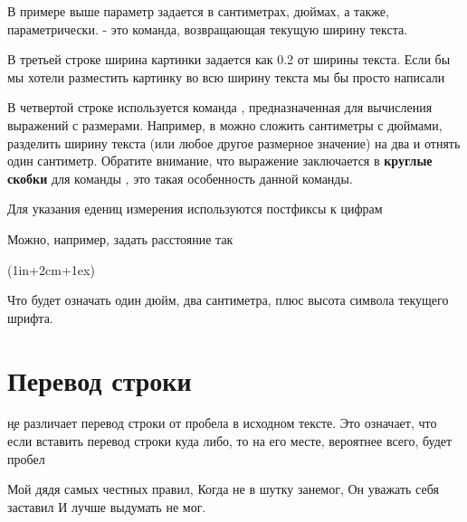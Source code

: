 {{{{В примере выше параметр  задается в сантиметрах, дюймах, а
также, параметрически.  - это команда, возвращающая текущую
ширину текста.

В третьей строке ширина картинки задается как 0.2 от ширины текста. Если бы мы
хотели разместить картинку во всю ширину текста мы бы просто
написали 

В четвертой строке используется команда , предназначенная для
вычисления выражений с размерами. Например, в  можно сложить
сантиметры с дюймами, разделить ширину текста (или любое другое размерное
значение) на два и отнять один сантиметр. Обратите внимание, что выражение
заключается в {\bf круглые скобки} для команды , это такая
особенность данной команды.

Для указания едениц измерения используются постфиксы к цифрам


Можно, например, задать расстояние так

\startTEX
\dimexpr(1in+2cm+1ex)
\stopTEX

Что будет означать один дюйм, два сантиметра, плюс высота символа 
текущего шрифта.

\section{Перевод строки}

\c  не различает перевод строки от пробела в исходном тексте. Это означает, что если
вставить перевод строки куда либо, то на его месте, вероятнее всего, будет пробел

\vbox{
 \hfill
\startTEX
Мой дядя самых честных правил,
Когда не в шутку занемог,
Он уважать себя заставил
И лучше выдумать не мог.
\stopTEX
\stopdescr
}

}}}}
